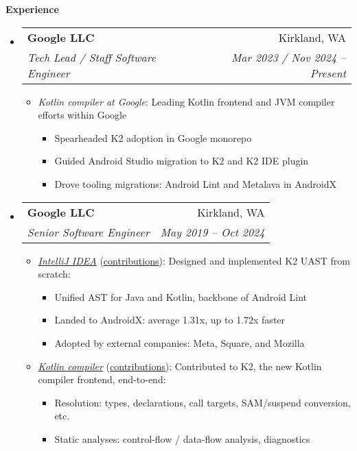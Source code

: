 \documentclass[letterpaper,11pt]{article}
\makeatletter
\newcommand{\resheading}[1]{{\large \colorbox{mygrey}{\begin{minipage}{\textwidth}{\textbf{#1 \vphantom{p\^{E}}}}\end{minipage}}}}
\newcommand{\ressubheading}[4]{
\begin{tabular*}{6.5in}{l@{\extracolsep{\fill}}r}
    \textbf{#1} & #2 \\
    \textit{#3} & \textit{#4} \\
\end{tabular*}\vspace{-6pt}}
\makeatother
\begin{document}
\resheading{Experience}
  \begin{itemize}
    \item
      \ressubheading{{Google LLC}}{Kirkland, WA}{Tech Lead / Staff Software Engineer}{Mar 2023 / Nov 2024 -- Present}
        {
\small
        \begin{itemize}
\item\emph{Kotlin compiler at Google}:
Leading Kotlin frontend and JVM compiler efforts within Google
\begin{itemize}
\item Spearheaded K2 adoption in Google monorepo
\item Guided Android Studio migration to K2 and K2 IDE plugin
\item Drove tooling migrations: Android Lint and Metalava in AndroidX
\end{itemize}
        \end{itemize}
        }
    \item
      \ressubheading{{Google LLC}}{Kirkland, WA}{Senior Software Engineer}{May 2019 -- Oct 2024}
        {
\small
        \begin{itemize}
\item\emph{\href{https://github.com/JetBrains/intellij-community}{IntelliJ IDEA}} (\href{https://github.com/JetBrains/intellij-community/commits?author=jsjeon}{\underline{contributions}}):
Designed and implemented K2 UAST from scratch:
\begin{itemize}
\item Unified AST for Java and Kotlin, backbone of Android Lint
\item Landed to AndroidX: average 1.31x, up to 1.72x faster
\item Adopted by external companies: Meta, Square, and Mozilla
\end{itemize}
\item\emph{\href{https://github.com/JetBrains/kotlin}{Kotlin compiler}} (\href{https://github.com/JetBrains/kotlin/commits?author=jsjeon}{\underline{contributions}}):
Contributed to K2, the new Kotlin compiler frontend, end-to-end:
\begin{itemize}
\item Resolution: types, declarations, call targets, SAM/suspend conversion, etc.
\item Static analyses: control-flow / data-flow analysis, diagnostics

\end{itemize}
\end{itemize}}
\end{itemize}
\end{document}
